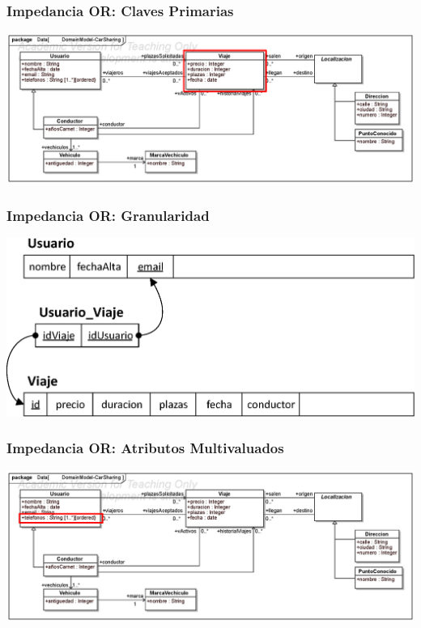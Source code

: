 \documentclass[a4paper,slidestop,xcolor=pst,blue]{beamer}
\begin{document}
\begin{frame}[c]
    \frametitle{Impedancia OR: Claves Primarias}
    \begin{center}
        \includegraphics[width=\linewidth]{images/ooMismatch/ooMismatch09.eps}
    \end{center}
\end{frame}

\begin{frame}[c]
    \frametitle{Impedancia OR: Granularidad}
    \begin{center}
        \includegraphics[width=0.8\linewidth]{images/ooMismatch/ooMismatch08.eps}
    \end{center}
\end{frame}

\begin{frame}[c]
    \frametitle{Impedancia OR: Atributos Multivaluados}
    \begin{center}
        \includegraphics[width=\linewidth]{images/ooMismatch/ooMismatch02.eps}
    \end{center}
\end{frame}
\end{document}
